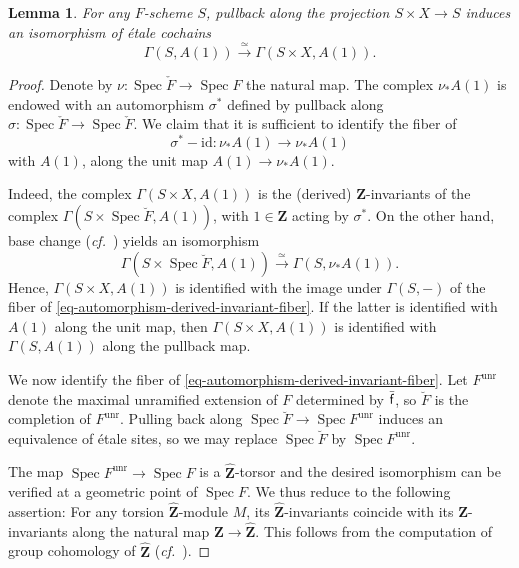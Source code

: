 \documentclass[10pt,english,reqno]{amsart}
\newcommand{\integers}{\mathbf Z}
\newcommand{\residue}{\textnormal{\textsf{f}}}
\newcommand{\unr}{\mathrm{unr}}
\newcommand{\id}{\mathrm{id}}
\newcommand{\Spec}{\operatorname{Spec}}
\newtheorem{lem}[subsubsection]{Lemma}
\theoremstyle{definition}
\numberwithin{equation}{section}
\begin{document}
\begin{lem}
\label{lem-weil-galois-torsion}
For any $F$-scheme $S$, pullback along the projection $S\times X \rightarrow S$ induces an isomorphism of \'etale cochains
\begin{equation}
\label{eq-weil-galois-torsion}
\Gamma(S, A(1)) \xrightarrow{\simeq} \Gamma(S\times X, A(1)).
\end{equation}
\end{lem}
\begin{proof}
Denote by $\nu : \Spec \check F \rightarrow \Spec F$ the natural map. The complex $\nu_*A(1)$ is endowed with an automorphism $\sigma^*$ defined by pullback along $\sigma : \Spec \check F \rightarrow \Spec \check F$. We claim that it is sufficient to identify the fiber of
\begin{equation}
\label{eq-automorphism-derived-invariant-fiber}
\sigma^* - \id : \nu_* A(1) \rightarrow \nu_* A(1)
\end{equation}
with $A(1)$, along the unit map $A(1) \rightarrow \nu_* A(1)$.

Indeed, the complex $\Gamma(S\times X, A(1))$ is the (derived) $\integers$-invariants of the complex $\Gamma(S\times\Spec\breve F, A(1))$, with $1\in\integers$ acting by $\sigma^*$. On the other hand, base change (\emph{cf.}~\cite[0F1I]{stacks-project}) yields an isomorphism
$$
\Gamma(S\times\Spec\breve F, A(1)) \xrightarrow{\simeq} \Gamma(S, \nu_*A(1)).
$$
Hence, $\Gamma(S\times X, A(1))$ is identified with the image under $\Gamma(S, -)$ of the fiber of \eqref{eq-automorphism-derived-invariant-fiber}. If the latter is identified with $A(1)$ along the unit map, then $\Gamma(S\times X, A(1))$ is identified with $\Gamma(S, A(1))$ along the pullback map.

We now identify the fiber of \eqref{eq-automorphism-derived-invariant-fiber}. Let $F^{\unr}$ denote the maximal unramified extension of $F$ determined by $\bar{\residue}$, so $\breve F$ is the completion of $F^{\unr}$. Pulling back along $\Spec \breve F \rightarrow \Spec F^{\unr}$ induces an equivalence of \'etale sites, so we may replace $\Spec \breve F$ by $\Spec F^{\unr}$.

The map $\Spec F^{\unr} \rightarrow \Spec F$ is a $\hat{\integers}$-torsor and the desired isomorphism can be verified at a geometric point of $\Spec F$. We thus reduce to the following assertion: For any torsion $\hat{\integers}$-module $M$, its $\hat{\integers}$-invariants coincide with its $\integers$-invariants along the natural map $\integers \rightarrow \hat{\integers}$. This follows from the computation of group cohomology of $\hat{\integers}$ (\emph{cf.}~\cite[XIII, \S1]{MR554237}).
\end{proof}
\end{document}
